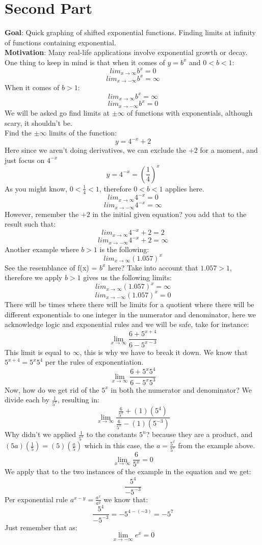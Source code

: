 \documentclass[12pt, letterpaper]{article}
\newcommand{\ltf}[1]{\lim_{{#1} \to \infty}}
\newcommand{\nltf}[1]{\lim_{{#1} \to -\infty}}
\begin{document}
\section{Second Part}
\textbf{Goal}: Quick graphing of shifted exponential functions. Finding limits at infinity of functions containing exponential.\\
\newline
\textbf{Motivation}: Many real-life applications involve exponential growth or decay.\\
\newline
One thing to keep in mind is that when it comes of \(y=b^x\) and \(0<b<1\):
\[lim_{x \to \infty}b^x = 0\]
\[lim_{x \to-\infty}b^x = \infty\]
When it comes of \(b>1\):
\[lim_{x \to \infty}b^x = \infty\]
\[lim_{x \to-\infty}b^x = 0\]
We will be asked go find limits at \(\pm \infty\) of functions with exponentials, although scary, it shouldn't be.\\
\newline
Find the \(\pm \infty\) limits of the function:
\[y=4^{-x}+2\]
Here since we aren't doing derivatives, we can exclude the \(+2\) for a moment, and just focus on \(4^{-x}\)
\[y=4^{-x}= \left(\frac{1}{4}\right)^x\]
As you might know, \(0 < \frac{1}{4} < 1\), therefore \(0<b<1\) applies here.
\[lim_{x \to \infty} 4^{-x} = 0\]
\[lim_{x \to -\infty} 4^{-x} = \infty\]
However, remember the \(+2\) in the initial given equation? you add that to the result such that:
\[lim_{x \to \infty} 4^{-x}+2 = 2\]
\[lim_{x \to -\infty} 4^{-x}+2 = \infty\]
Another example where \(b>1\) is the following:
\[lim_{x \to \infty} (1.057)^x\]
See the resemblance of f(x) = \(b^x\) here? Take into account that \(1.057 > 1\), therefore we apply \(b>1\) gives us the following limits:
\[lim_{x \to \infty} (1.057)^x = \infty\]
\[lim_{x \to -\infty} (1.057)^x = 0\]
There will be times where there will be limits for a quotient where there will be different exponentials to one integer in the numerator and denominator, here we acknowledge logic and exponential rules and we will be safe, take for instance:
\[\ltf{x} \frac{6+5^{x+4}}{6-5^{x-3}}\]
This limit is equal to \(\infty\), this is why we have to break it down. We know that \(5^{x+4} = 5^{x}5^{4}\) per the rules of exponentiation.
\[\ltf{x} \frac{6+5^x5^4}{6-5^x5^3}\]
Now, how do we get rid of the \(5^x\) in both the numerator and denominator? We divide each by \(\frac{1}{5^x}\), resulting in:
\[\ltf{x} \frac{\frac{6}{5^x}+(1)(5^4)}{\frac{6}{5^x}-(1)(5^{-3})}\]
Why didn't we applied \(\frac{1}{5^x}\) to the constants \(5^n\)? because they are a product, and \((5a)(\frac{1}{5}) = (5)(\frac{a}{5})\) which in this case, the \(a = \frac{5^x}{5^x}\) from the example above.
\[\ltf{x} \frac{6}{5^x} = 0\]
We apply that to the two instances of the example in the equation and we get:
\[\frac{5^4}{-5^{-3}}\]
Per exponential rule \(a^{x-y}=\frac{a^x}{a^y}\) we know that:
\[\frac{5^4}{-5^{-3}} = -5^{4-(-3)} = -5^7\]
Just remember that as:
\[\nltf{x}e^x = 0\]
\end{document}
